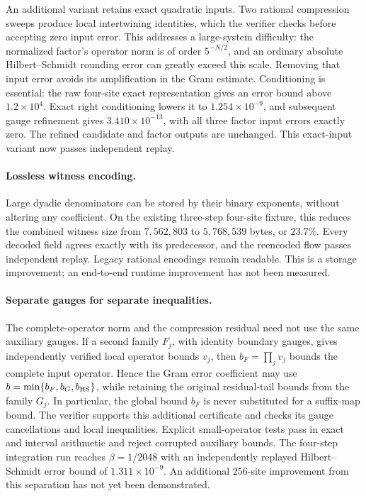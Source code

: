 \documentclass[11pt]{article}
\begin{document}
An additional variant retains exact quadratic inputs. Two rational
compression sweeps produce local intertwining identities, which the
verifier checks before accepting zero input error. This addresses a
large-system difficulty: the normalized factor's operator norm is of
order $5^{-N/2}$, and an ordinary absolute Hilbert--Schmidt rounding error
can greatly exceed this scale. Removing that input error avoids its
amplification in the Gram estimate. Conditioning is essential: the raw
four-site exact representation gives an error bound above $1.2\times10^4$.
Exact right conditioning lowers it to $1.254\times10^{-9}$, and subsequent
gauge refinement gives $3.410\times10^{-13}$, with all three factor input
errors exactly zero. The refined candidate and factor outputs are unchanged.
This exact-input variant now passes independent replay.

\paragraph{Lossless witness encoding.}
Large dyadic denominators can be stored by their binary exponents, without
altering any coefficient. On the existing three-step four-site fixture,
this reduces the combined witness size from $7{,}562{,}803$ to
$5{,}768{,}539$ bytes, or $23.7\%$. Every decoded field agrees exactly
with its predecessor, and the reencoded flow passes independent replay.
Legacy rational encodings remain readable. This is a storage improvement;
an end-to-end runtime improvement has not been measured.

\paragraph{Separate gauges for separate inequalities.}
The complete-operator norm and the compression residual need not use the
same auxiliary gauges. If a second family $F_j$, with identity boundary
gauges, gives independently verified local operator bounds $v_j$, then
$b_F=\prod_jv_j$ bounds the complete input operator. Hence the Gram error
coefficient may use $b=\min\{b_F,b_G,b_{\rm HS}\}$, while retaining the
original residual-tail bounds from the family $G_j$. In particular, the
global bound $b_F$ is never substituted for a suffix-map bound.
The verifier supports this additional certificate and checks its gauge
cancellations and local inequalities. Explicit small-operator tests pass
in exact and interval arithmetic and reject corrupted auxiliary bounds.
The four-step integration run reaches $\beta=1/2048$ with an independently
replayed Hilbert--Schmidt error bound of $1.311\times10^{-9}$.
An additional $256$-site improvement from this separation has not
yet been demonstrated.
\end{document}
